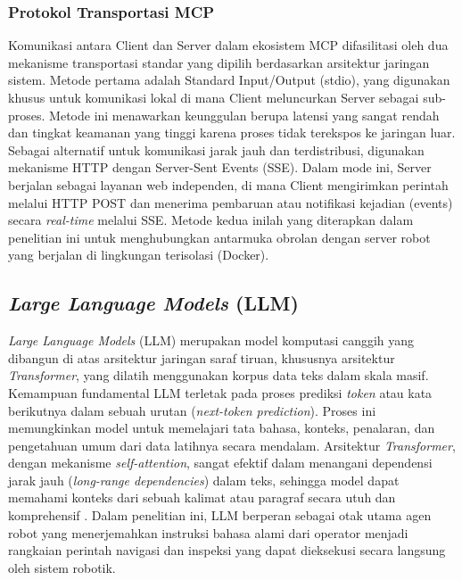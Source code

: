 \subsubsection{Protokol Transportasi MCP} Komunikasi antara Client dan Server dalam ekosistem MCP difasilitasi oleh dua mekanisme transportasi standar yang dipilih berdasarkan arsitektur jaringan sistem. Metode pertama adalah Standard Input/Output (stdio), yang digunakan khusus untuk komunikasi lokal di mana Client meluncurkan Server sebagai sub-proses. Metode ini menawarkan keunggulan berupa latensi yang sangat rendah dan tingkat keamanan yang tinggi karena proses tidak terekspos ke jaringan luar. Sebagai alternatif untuk komunikasi jarak jauh dan terdistribusi, digunakan mekanisme HTTP dengan Server-Sent Events (SSE). Dalam mode ini, Server berjalan sebagai layanan web independen, di mana Client mengirimkan perintah melalui HTTP POST dan menerima pembaruan atau notifikasi kejadian (events) secara \textit{real-time} melalui SSE. Metode kedua inilah yang diterapkan dalam penelitian ini untuk menghubungkan antarmuka obrolan dengan server robot yang berjalan di lingkungan terisolasi (Docker).

\subsection{\textit{Large Language Models} (LLM)}
\textit{Large Language Models} (LLM) merupakan model komputasi canggih yang dibangun di atas arsitektur jaringan saraf tiruan, khususnya arsitektur \textit{Transformer}, yang dilatih menggunakan korpus data teks dalam skala masif. Kemampuan fundamental LLM terletak pada proses prediksi \textit{token} atau kata berikutnya dalam sebuah urutan (\textit{next-token prediction}). Proses ini memungkinkan model untuk memelajari tata bahasa, konteks, penalaran, dan pengetahuan umum dari data latihnya secara mendalam. Arsitektur \textit{Transformer}, dengan mekanisme \textit{self-attention}, sangat efektif dalam menangani dependensi jarak jauh (\textit{long-range dependencies}) dalam teks, sehingga model dapat memahami konteks dari sebuah kalimat atau paragraf secara utuh dan komprehensif \cite{chang2024survey}. Dalam penelitian ini, LLM berperan sebagai otak utama agen robot yang menerjemahkan instruksi bahasa alami dari operator menjadi rangkaian perintah navigasi dan inspeksi yang dapat dieksekusi secara langsung oleh sistem robotik.

